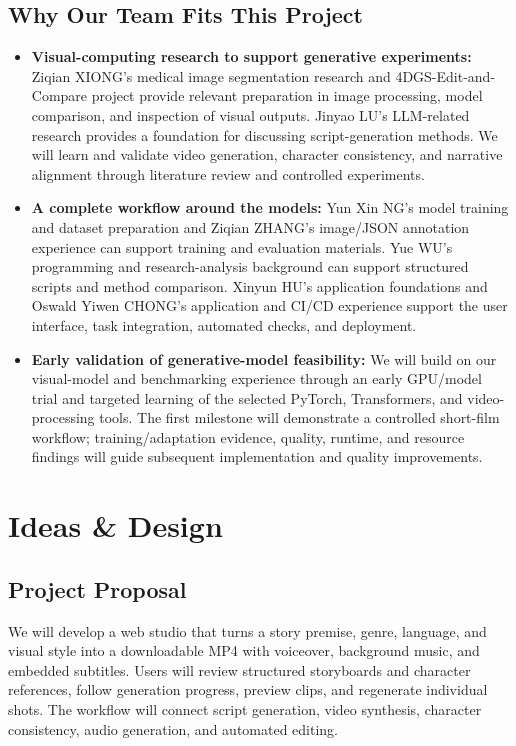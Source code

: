 \documentclass[a4paper,12pt]{article}
\begin{document}
\subsection{Why Our Team Fits This Project}
\begin{itemize}
  \item \textbf{Visual-computing research to support generative experiments:} Ziqian XIONG's medical image segmentation research and 4DGS-Edit-and-Compare project provide relevant preparation in image processing, model comparison, and inspection of visual outputs. Jinyao LU's LLM-related research provides a foundation for discussing script-generation methods. We will learn and validate video generation, character consistency, and narrative alignment through literature review and controlled experiments.
  \item \textbf{A complete workflow around the models:} Yun Xin NG's model training and dataset preparation and Ziqian ZHANG's image/JSON annotation experience can support training and evaluation materials. Yue WU's programming and research-analysis background can support structured scripts and method comparison. Xinyun HU's application foundations and Oswald Yiwen CHONG's application and CI/CD experience support the user interface, task integration, automated checks, and deployment.
  \item \textbf{Early validation of generative-model feasibility:} We will build on our visual-model and benchmarking experience through an early GPU/model trial and targeted learning of the selected PyTorch, Transformers, and video-processing tools. The first milestone will demonstrate a controlled short-film workflow; training/adaptation evidence, quality, runtime, and resource findings will guide subsequent implementation and quality improvements.
\end{itemize}

\newpage

\section{Ideas \& Design}
\subsection{Project Proposal}
We will develop a web studio that turns a story premise, genre, language, and visual style into a downloadable MP4 with voiceover, background music, and embedded subtitles. Users will review structured storyboards and character references, follow generation progress, preview clips, and regenerate individual shots. The workflow will connect script generation, video synthesis, character consistency, audio generation, and automated editing.
\end{document}
